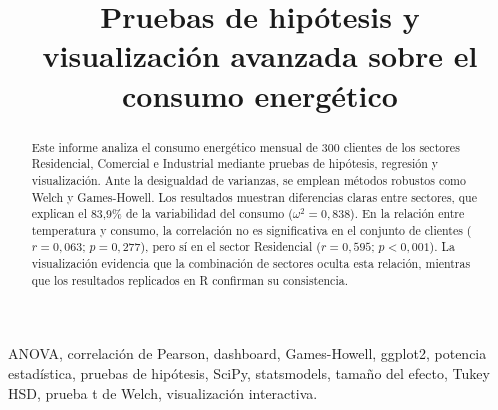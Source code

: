 \documentclass[conference]{IEEEtran}
\begin{document}
    \raggedbottom

    \title{
        Pruebas de hipótesis y visualización avanzada sobre el consumo energético
    }

    \author{
    }

    \maketitle
    \thispagestyle{plain}

    \begin{abstract}
        Este informe analiza el consumo energético mensual de 300
        clientes de los sectores Residencial, Comercial e Industrial mediante
        pruebas de hipótesis, regresión y visualización. Ante la desigualdad de
        varianzas, se emplean métodos robustos como Welch y Games-Howell. Los
        resultados muestran diferencias claras entre sectores, que explican el
        83,9\% de la variabilidad del consumo ($\omega^2=0,838$). En la relación
        entre temperatura y consumo, la correlación no es significativa en el
        conjunto de clientes ($r=0,063$; $p=0,277$), pero sí en el sector
        Residencial ($r=0,595$; $p<0,001$). La visualización evidencia que la
        combinación de sectores oculta esta relación, mientras que los
        resultados replicados en R confirman su consistencia.
    \end{abstract}

    \vspace{10pt}

    \begin{IEEEkeywords}
        ANOVA, correlación de Pearson, dashboard, Games-Howell, ggplot2,
        potencia estadística, pruebas de hipótesis, SciPy, statsmodels,
        tamaño del efecto, Tukey HSD, prueba t de Welch, visualización interactiva.
    \end{IEEEkeywords}

    
    
    
    
    
    

    \appendices
    
    

    
    
\end{document}
